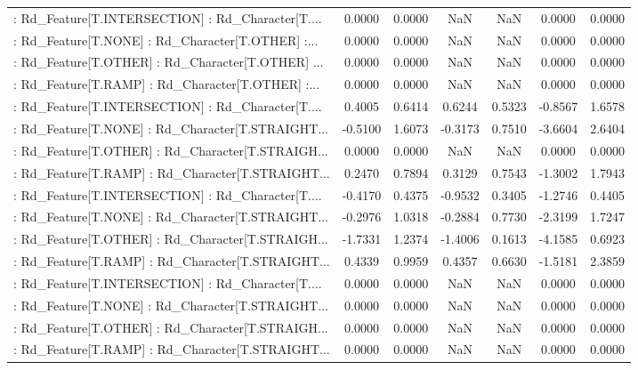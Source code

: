\begin{longtable}{p{4cm}cccccc}
 : Rd\_Feature[T.INTERSECTION] : Rd\_Character[T.... &  0.0000 &    0.0000 &     NaN &          NaN &  0.0000 &  0.0000 \\
 : Rd\_Feature[T.NONE] : Rd\_Character[T.OTHER] :... &  0.0000 &    0.0000 &     NaN &          NaN &  0.0000 &  0.0000 \\
 : Rd\_Feature[T.OTHER] : Rd\_Character[T.OTHER] ... &  0.0000 &    0.0000 &     NaN &          NaN &  0.0000 &  0.0000 \\
 : Rd\_Feature[T.RAMP] : Rd\_Character[T.OTHER] :... &  0.0000 &    0.0000 &     NaN &          NaN &  0.0000 &  0.0000 \\
 : Rd\_Feature[T.INTERSECTION] : Rd\_Character[T.... &  0.4005 &    0.6414 &  0.6244 &       0.5323 & -0.8567 &  1.6578 \\
 : Rd\_Feature[T.NONE] : Rd\_Character[T.STRAIGHT... & -0.5100 &    1.6073 & -0.3173 &       0.7510 & -3.6604 &  2.6404 \\
 : Rd\_Feature[T.OTHER] : Rd\_Character[T.STRAIGH... &  0.0000 &    0.0000 &     NaN &          NaN &  0.0000 &  0.0000 \\
 : Rd\_Feature[T.RAMP] : Rd\_Character[T.STRAIGHT... &  0.2470 &    0.7894 &  0.3129 &       0.7543 & -1.3002 &  1.7943 \\
 : Rd\_Feature[T.INTERSECTION] : Rd\_Character[T.... & -0.4170 &    0.4375 & -0.9532 &       0.3405 & -1.2746 &  0.4405 \\
 : Rd\_Feature[T.NONE] : Rd\_Character[T.STRAIGHT... & -0.2976 &    1.0318 & -0.2884 &       0.7730 & -2.3199 &  1.7247 \\
 : Rd\_Feature[T.OTHER] : Rd\_Character[T.STRAIGH... & -1.7331 &    1.2374 & -1.4006 &       0.1613 & -4.1585 &  0.6923 \\
 : Rd\_Feature[T.RAMP] : Rd\_Character[T.STRAIGHT... &  0.4339 &    0.9959 &  0.4357 &       0.6630 & -1.5181 &  2.3859 \\
 : Rd\_Feature[T.INTERSECTION] : Rd\_Character[T.... &  0.0000 &    0.0000 &     NaN &          NaN &  0.0000 &  0.0000 \\
 : Rd\_Feature[T.NONE] : Rd\_Character[T.STRAIGHT... &  0.0000 &    0.0000 &     NaN &          NaN &  0.0000 &  0.0000 \\
 : Rd\_Feature[T.OTHER] : Rd\_Character[T.STRAIGH... &  0.0000 &    0.0000 &     NaN &          NaN &  0.0000 &  0.0000 \\
 : Rd\_Feature[T.RAMP] : Rd\_Character[T.STRAIGHT... &  0.0000 &    0.0000 &     NaN &          NaN &  0.0000 &  0.0000 \\

\end{longtable}
